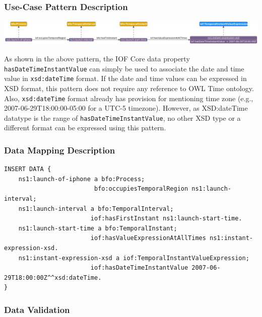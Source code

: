 \subsubsection*{Use-Case Pattern Description}

\includegraphics[scale=0.29]{scenarios/clock-time-calendar-date/images/uc1-xsd.png}

As shown in the above pattern, the IOF Core data property \texttt{hasDateTimeInstantValue} can simply be used to associate the date and time value in \texttt{xsd:dateTime} format. If the date and time values can be expressed in XSD format, this pattern does not require any reference to OWL Time ontology. Also, \texttt{xsd:dateTime} format already has provision for mentioning time zone (e.g., 2007-06-29T18:00:00-05:00 for a UTC-5 timezone). However, as XSD:dateTime datatype is the range of \texttt{hasDateTimeInstantValue}, no other XSD type or a different format can be expressed using this pattern. 



\subsubsection*{Data Mapping Description}

\begin{verbatim}
INSERT DATA {
    ns1:launch-of-iphone a bfo:Process;
                         bfo:occupiesTemporalRegion ns1:launch-interval;
    ns1:launch-interval a bfo:TemporalInterval;
                        iof:hasFirstInstant ns1:launch-start-time.
    ns1:launch-start-time a bfo:TemporalInstant;
                        iof:hasValueExpressionAtAllTimes ns1:instant-expression-xsd.
    ns1:instant-expression-xsd a iof:TemporalInstantValueExpression; 
                        iof:hasDateTimeInstantValue 2007-06-29T18:00:00Z^^xsd:dateTime.
}
\end{verbatim}


\subsubsection*{Data Validation}

